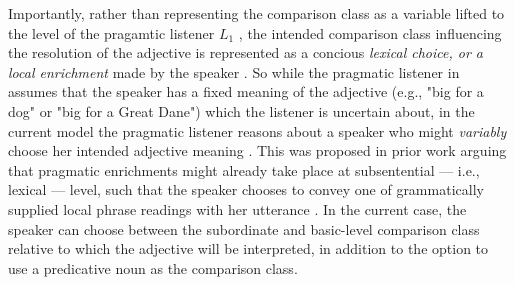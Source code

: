 Importantly, rather than representing the comparison class as a variable lifted to the level of the pragamtic listener $L_1$ \parencite[as proposed by][]{tessler2017warm}, the intended comparison class influencing the resolution of the adjective is represented as a concious \emph{lexical choice, or a local enrichment} made by the speaker \parencite[e.g., discussed by][]{chierchia2012grammatical, problang}. So while the pragmatic listener in \textcite{tessler2017warm} assumes that the speaker has a fixed meaning of the adjective (e.g., "big for a dog" or "big for a Great Dane") which the listener is uncertain about, in the current model the pragmatic listener reasons about a speaker who might \emph{variably} choose her intended adjective meaning \parencite[cf.][]{problang}. 
This was proposed in prior work arguing that pragmatic enrichments might already take place at subsentential --- i.e., lexical --- level, such that the speaker chooses to convey one of grammatically supplied local phrase readings with her utterance \parencite[for instance, applied to scalar implicatures by][]{chierchia2012grammatical}. In the current case, the speaker can choose between the subordinate and basic-level comparison class relative to which the adjective will be interpreted, in addition to the option to use a predicative noun as the comparison class. 


